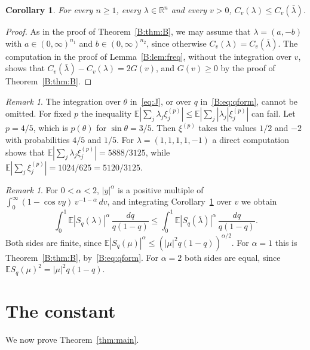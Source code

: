 \documentclass[11pt]{amsart}
\newtheorem{corollary}[theorem]{Corollary}
\theoremstyle{remark}
\newtheorem{remark}[theorem]{Remark}
\numberwithin{equation}{section}
\newcommand{\R}{\mathbb{R}}
\newcommand{\E}{\mathbb{E}}
\begin{document}
\begin{corollary}\label{B:cor:freq}
For every $n\ge1$, every $\lambda\in\R^n$ and every $v>0$, $C_v(\lambda)\le C_v(\bar\lambda)$.
\end{corollary}

\begin{proof}
As in the proof of Theorem~\ref{B:thm:B}, we may assume that $\lambda=(a,-b)$ with $a\in(0,\infty)^{n_1}$ and $b\in(0,\infty)^{n_2}$, since otherwise $C_v(\lambda)=C_v(\bar\lambda)$. The computation in the proof of Lemma~\ref{B:lem:freq}, without the integration over $v$, shows that $C_v(\bar\lambda)-C_v(\lambda)=2G(v)$, and $G(v)\ge0$ by the proof of Theorem~\ref{B:thm:B}.
\end{proof}

\begin{remark}\label{B:rem:fixedtheta}
The integration over $\theta$ in~\eqref{eq:J}, or over $q$ in~\eqref{B:eq:qform}, cannot be omitted. For fixed $p$ the inequality $\E|\sum_j\lambda_j\xi_j^{(p)}|\le\E|\sum_j|\lambda_j|\xi_j^{(p)}|$ can fail. Let $p=4/5$, which is $p(\theta)$ for $\sin\theta=3/5$. Then $\xi^{(p)}$ takes the values $1/2$ and $-2$ with probabilities $4/5$ and $1/5$. For $\lambda=(1,1,1,1,-1)$ a direct computation shows that $\E|\sum_j\lambda_j\xi_j^{(p)}|=5888/3125$, while $\E|\sum_j\xi_j^{(p)}|=1024/625=5120/3125$.
\end{remark}

\begin{remark}\label{B:rem:frequency}
For $0<\alpha<2$, $|y|^\alpha$ is a positive multiple of $\int_0^\infty(1-\cos vy)\,v^{-1-\alpha}\,dv$, and integrating Corollary~\ref{B:cor:freq} over $v$ we obtain
\[
\int_0^1\E|S_q(\lambda)|^\alpha\,\frac{dq}{q(1-q)}\le\int_0^1\E|S_q(\bar\lambda)|^\alpha\,\frac{dq}{q(1-q)}.
\]
Both sides are finite, since $\E|S_q(\mu)|^\alpha\le(|\mu|^2q(1-q))^{\alpha/2}$. For $\alpha=1$ this is Theorem~\ref{B:thm:B}, by~\eqref{B:eq:qform}. For $\alpha=2$ both sides are equal, since $\E S_q(\mu)^2=|\mu|^2q(1-q)$.
\end{remark}

\section{The constant}\label{sec:constant}

We now prove Theorem~\ref{thm:main}.
\end{document}
